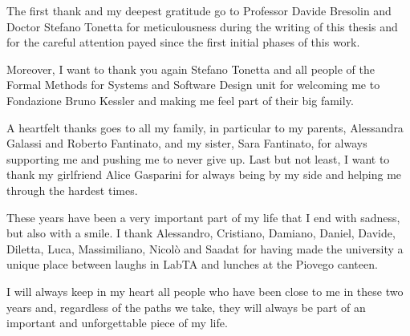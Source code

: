 
The first thank and my deepest gratitude go to Professor Davide Bresolin and Doctor Stefano Tonetta for meticulousness during the writing of this thesis and for the careful attention payed since the first initial phases of this work.

Moreover, I want to thank you again Stefano Tonetta and all people of the Formal Methods for Systems and Software Design unit for welcoming me to Fondazione Bruno Kessler and making me feel part of their big family.

A heartfelt thanks goes to all my family, in particular to my parents, Alessandra Galassi and Roberto Fantinato, and my sister, Sara Fantinato, for always supporting me and pushing me to never give up.
Last but not least, I want to thank my girlfriend Alice Gasparini for always being by my side and helping me through the hardest times.

These years have been a very important part of my life that I end with sadness, but also with a smile. I thank Alessandro, Cristiano, Damiano, Daniel, Davide, Diletta, Luca, Massimiliano, Nicolò and Saadat for having made the university a unique place between laughs in LabTA and lunches at the Piovego canteen.

I will always keep in my heart all people who have been close to me in these two years and, regardless of the paths we take, they will always be part of an important and unforgettable piece of my life.
